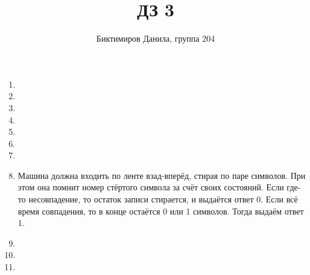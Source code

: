 \documentclass[11pt]{article}
\begin{document}
	
	\author{Биктимиров Данила, группа 204}
	\title{ДЗ 3}
	\date{}
	\maketitle
	
	\medskip
	
	\begin{enumerate}
		
		\item 
		\item 
		\item 
		\item 
		\item 
		\item 
		\item 
		\item Машина должна входить по ленте взад-вперёд, стирая по паре символов. При этом она помнит номер стёртого символа за счёт своих состояний. Если где-то несовпадение, то остаток записи стирается, и выдаётся ответ 0. Если всё время совпадения, то в конце остаётся 0 или 1 символов. Тогда выдаём ответ 1.
		\item 
		\item 
		\item 
		
	\end{enumerate}
\end{document}
